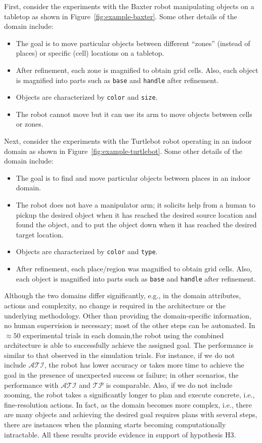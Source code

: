 \documentclass[letterpaper, 10 pt, conference]{ieeeconf}  %
\newcommand{\stt}[1]{{\small\texttt{#1}}}
\begin{document}
First, consider the experiments with the Baxter robot manipulating
objects on a tabletop as shown in Figure~\ref{fig:example-baxter}.
Some other details of the domain include:
\begin{itemize}
\item The goal is to move particular objects between different
  ``zones'' (instead of places) or specific (cell) locations on a
  tabletop.
\item After refinement, each zone is magnified to obtain grid cells.
  Also, each object is magnified into parts such as \stt{base} and
  \stt{handle} after refinement.
\item Objects are characterized by \stt{color} and \stt{size}.
\item The robot cannot move but it can use its arm to move objects
  between cells or zones.
\end{itemize}

Next, consider the experiments with the Turtlebot robot operating in
an indoor domain as shown in Figure~\ref{fig:example-turtlebot}. Some
other details of the domain include:
\begin{itemize}
\item The goal is to find and move particular objects between places
  in an indoor domain.
\item The robot does not have a manipulator arm; it solicits help from
  a human to pickup the desired object when it has reached the desired
  source location and found the object, and to put the object down
  when it has reached the desired target location.
\item Objects are characterized by \stt{color} and \stt{type}. 
\item After refinement, each place/region was magnified to obtain grid
  cells. Also, each object is magnified into parts such as \stt{base}
  and \stt{handle} after refinement.
\end{itemize}
Although the two domains differ significantly, e.g., in the domain
attributes, actions and complexity, no change is required in the
architecture or the underlying methodology. Other than providing the
domain-specific information, no human supervision is necessary; most
of the other steps can be automated. In $\approx 50$ experimental
trials in each domain,the robot using the combined architecture is
able to successfully achieve the assigned goal. The performance is
similar to that observed in the simulation trials. For instance, if we
do not include $\mathcal{ATI}$, the robot has lower accuracy or takes
more time to achieve the goal in the presence of unexpected success or
failure; in other scenarios, the performance with $\mathcal{ATI}$ and
$\mathcal{TP}$ is comparable. Also, if we do not include zooming, the
robot takes a significantly longer to plan and execute concrete, i.e.,
fine-resolution actions. In fact, as the domain becomes more complex,
i.e., there are many objects and achieving the desired goal requires
plans with several steps, there are instances when the planning starts
becoming computationally intractable. All these results provide
evidence in support of hypothesis H3.
\end{document}
